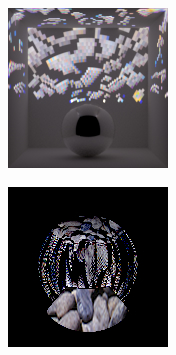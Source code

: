 \begin{figure}[]
\begin{subfigure}{\textwidth}
\begin{subfigure}{0.19\textwidth}
            \centering
            \includegraphics[width=\textwidth]{images/04-experiment03/ball/pebbles/stats_proj.jpg}
            \caption*{}
        \end{subfigure}
        \hfill
        \begin{subfigure}{0.19\textwidth}
            \centering
            \includegraphics[width=\textwidth]{images/04-experiment03/ball/pebbles/pixel_im.jpg}

\end{subfigure}
\end{subfigure}
\end{figure}
